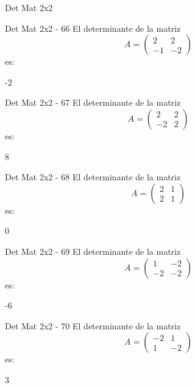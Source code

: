 \documentclass[a4,11pt]{aleph-notas}
\begin{document}
\begin{quiz}{Det Mat 2x2}
\begin{numerical}[tolerance=0]%
    {Det Mat 2x2 - 66}
    El determinante de la matriz
    \[
        A = \begin{pmatrix} 2 & 2 \\ -1 & -2 \end{pmatrix}
    \]
    es:
    \item[] -2
\end{numerical}

\begin{numerical}[tolerance=0]%
    {Det Mat 2x2 - 67}
    El determinante de la matriz
    \[
        A = \begin{pmatrix} 2 & 2 \\ -2 & 2 \end{pmatrix}
    \]
    es:
    \item[] 8
\end{numerical}

\begin{numerical}[tolerance=0]%
    {Det Mat 2x2 - 68}
    El determinante de la matriz
    \[
        A = \begin{pmatrix} 2 & 1 \\ 2 & 1 \end{pmatrix}
    \]
    es:
    \item[] 0
\end{numerical}

\begin{numerical}[tolerance=0]%
    {Det Mat 2x2 - 69}
    El determinante de la matriz
    \[
        A = \begin{pmatrix} 1 & -2 \\ -2 & -2 \end{pmatrix}
    \]
    es:
    \item[] -6
\end{numerical}

\begin{numerical}[tolerance=0]%
    {Det Mat 2x2 - 70}
    El determinante de la matriz
    \[
        A = \begin{pmatrix} -2 & 1 \\ 1 & -2 \end{pmatrix}
    \]
    es:
    \item[] 3
\end{numerical}


\end{quiz}
\end{document}
